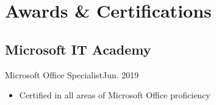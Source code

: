 \section{Awards \& Certifications}
\subsection{Microsoft IT Academy}{Microsoft Office Specialist}{}{Jun. 2019}
\begin{itemize}
    \item Certified in all areas of Microsoft Office proficiency
\end{itemize}
